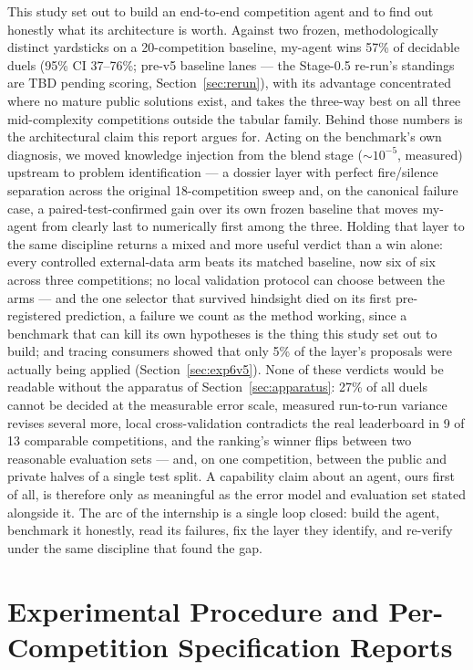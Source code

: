\documentclass[11pt,a4paper]{article}
\begin{document}
This study set out to build an end-to-end competition agent and to find out honestly what its architecture is worth. Against two frozen, methodologically distinct yardsticks on a 20-competition baseline, my-agent wins 57\% of decidable duels (95\% CI 37--76\%; pre-v5 baseline lanes --- the Stage-0.5 re-run's standings are TBD pending scoring, Section~\ref{sec:rerun}), with its advantage concentrated where no mature public solutions exist, and takes the three-way best on all three mid-complexity competitions outside the tabular family. Behind those numbers is the architectural claim this report argues for. Acting on the benchmark's own diagnosis, we moved knowledge injection from the blend stage (${\sim}10^{-5}$, measured) upstream to problem identification --- a dossier layer with perfect fire/silence separation across the original 18-competition sweep and, on the canonical failure case, a paired-test-confirmed gain over its own frozen baseline that moves my-agent from clearly last to numerically first among the three. Holding that layer to the same discipline returns a mixed and more useful verdict than a win alone: every controlled external-data arm beats its matched baseline, now six of six across three competitions; no local validation protocol can choose between the arms --- and the one selector that survived hindsight died on its first pre-registered prediction, a failure we count as the method working, since a benchmark that can kill its own hypotheses is the thing this study set out to build; and tracing consumers showed that only 5\% of the layer's proposals were actually being applied (Section~\ref{sec:exp6v5}). None of these verdicts would be readable without the apparatus of Section~\ref{sec:apparatus}: 27\% of all duels cannot be decided at the measurable error scale, measured run-to-run variance revises several more, local cross-validation contradicts the real leaderboard in 9 of 13 comparable competitions, and the ranking's winner flips between two reasonable evaluation sets --- and, on one competition, between the public and private halves of a single test split. A capability claim about an agent, ours first of all, is therefore only as meaningful as the error model and evaluation set stated alongside it. The arc of the internship is a single loop closed: build the agent, benchmark it honestly, read its failures, fix the layer they identify, and re-verify under the same discipline that found the gap.

\appendix

\section{Experimental Procedure and Per-Competition Specification Reports}
\label{app:specs}
\end{document}
